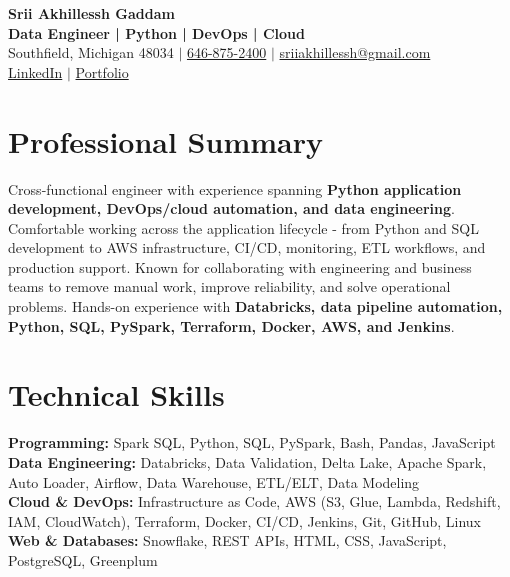 \documentclass[letterpaper,10pt]{article}
\begin{document}
\fontsize{9.35pt}{10.45pt}\selectfont

\begin{center}
    {\LARGE \textbf{Srii Akhillessh Gaddam}} \\[-1pt]
    \textbf{Data Engineer | Python | DevOps | Cloud} \\[2pt]
    Southfield, Michigan 48034 $|$
    \href{tel:6468752400}{646-875-2400} $|$
    \href{mailto:sriiakhillessh@gmail.com}{sriiakhillessh@gmail.com} \\[1pt]
    \href{https://www.linkedin.com/in/srii-akhiilessh-gaddam-b48668191/}{LinkedIn} $|$
    \href{https://sriiakhillesshg.github.io/portfolio/}{Portfolio}
\end{center}
\vspace{-8pt}

\section{Professional Summary}
\small{Cross-functional engineer with experience spanning \textbf{Python application development, DevOps/cloud automation, and data engineering}. Comfortable working across the application lifecycle - from Python and SQL development to AWS infrastructure, CI/CD, monitoring, ETL workflows, and production support. Known for collaborating with engineering and business teams to remove manual work, improve reliability, and solve operational problems. Hands-on experience with \textbf{Databricks, data pipeline automation, Python, SQL, PySpark, Terraform, Docker, AWS, and Jenkins}.}

\section{Technical Skills}
\small{
\textbf{Programming:} Spark SQL, Python, SQL, PySpark, Bash, Pandas, JavaScript \\
\textbf{Data Engineering:} Databricks, Data Validation, Delta Lake, Apache Spark, Auto Loader, Airflow, Data Warehouse, ETL/ELT, Data Modeling \\
\textbf{Cloud \& DevOps:} Infrastructure as Code, AWS (S3, Glue, Lambda, Redshift, IAM, CloudWatch), Terraform, Docker, CI/CD, Jenkins, Git, GitHub, Linux \\
\textbf{Web \& Databases:} Snowflake, REST APIs, HTML, CSS, JavaScript, PostgreSQL, Greenplum
}
\end{document}
